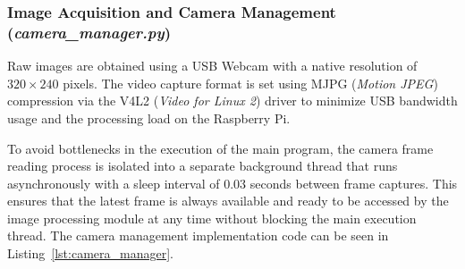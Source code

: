 \subsubsection{Image Acquisition and Camera Management (\textit{camera\_manager.py})}
Raw images are obtained using a USB Webcam with a native resolution of $320 \times 240$ pixels. The video capture format is set using MJPG (\textit{Motion JPEG}) compression via the V4L2 (\textit{Video for Linux 2}) driver to minimize USB bandwidth usage and the processing load on the Raspberry Pi.

To avoid bottlenecks in the execution of the main program, the camera frame reading process is isolated into a separate background thread that runs asynchronously with a sleep interval of $0.03$ seconds between frame captures. This ensures that the latest frame is always available and ready to be accessed by the image processing module at any time without blocking the main execution thread. The camera management implementation code can be seen in Listing~\ref{lst:camera_manager}.

